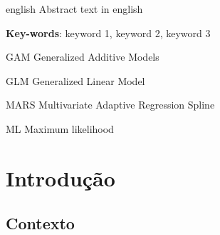 \documentclass[
	12pt,				%
	openright,			%
	oneside,			%
	a4paper,			%
	english,			%
	brazil				%
	]{abntex2}
\begin{document}
\begin{resumo}[Abstract]
 \begin{otherlanguage*}{english}
    Abstract text in english
   
   \textbf{Key-words}: keyword 1, keyword 2, keyword 3
 \end{otherlanguage*}
\end{resumo}

\listoffigures*
\cleardoublepage

\listoftables*
\cleardoublepage

\begin{siglas}
  \item[GAM] Generalized Additive Models
  \item[GLM] Generalized Linear Model
  \item[MARS] Multivariate Adaptive Regression Spline
  \item[ML] Maximum likelihood
\end{siglas}

\tableofcontents*
\cleardoublepage

\textual
\chapter{Introdução}

\section{Contexto}
\end{document}
